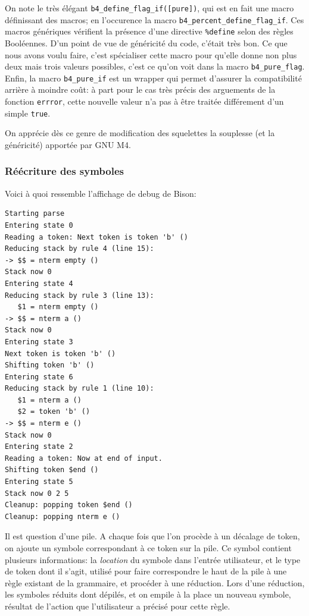 \documentclass[a4paper,11pt,twoside,final]{article}
\begin{document}
  On note le très élégant \texttt{b4\_define\_flag\_if([pure])}, qui est en fait
  une macro définissant des macros; en l'occurence la macro
  \texttt{b4\_percent\_define\_flag\_if}. Ces macros génériques vérifient la
  présence d'une directive \texttt{\%define} selon des règles Booléennes. D'un
  point de vue de généricité du code, c'était très bon. Ce que nous avons voulu
  faire, c'est spécialiser cette macro pour qu'elle donne non plus deux mais
  trois valeurs possibles, c'est ce qu'on voit dans la macro
  \texttt{b4\_pure\_flag}. Enfin, la macro \texttt{b4\_pure\_if} est un wrapper
  qui permet d'assurer la compatibilité arrière à moindre coût: à part pour le
  cas très précis des arguements de la fonction \texttt{errror}, cette nouvelle
  valeur n'a pas à être traitée différement d'un simple \texttt{true}.

  On apprécie dès ce genre de modification des squelettes la souplesse (et la
  généricité) apportée par GNU M4.

  \subsubsection{Réécriture des symboles}

  Voici à quoi ressemble l'affichage de debug de Bison:

  \begin{verbatim}
Starting parse
Entering state 0
Reading a token: Next token is token 'b' ()
Reducing stack by rule 4 (line 15):
-> $$ = nterm empty ()
Stack now 0
Entering state 4
Reducing stack by rule 3 (line 13):
   $1 = nterm empty ()
-> $$ = nterm a ()
Stack now 0
Entering state 3
Next token is token 'b' ()
Shifting token 'b' ()
Entering state 6
Reducing stack by rule 1 (line 10):
   $1 = nterm a ()
   $2 = token 'b' ()
-> $$ = nterm e ()
Stack now 0
Entering state 2
Reading a token: Now at end of input.
Shifting token $end ()
Entering state 5
Stack now 0 2 5
Cleanup: popping token $end ()
Cleanup: popping nterm e ()
  \end{verbatim}

  Il est question d'une pile. A chaque fois que l'on procède à un décalage de
  token, on ajoute un symbole correspondant à ce token sur la pile. Ce symbol
  contient plusieurs informations: la \textit{location} du symbole dans
  l'entrée utilisateur, et le type de token dont il s'agit, utilisé pour
  faire correspondre le haut de la pile à une règle existant de la grammaire,
  et procéder à une réduction. Lors d'une réduction, les symboles réduits dont
  dépilés, et on empile à la place un nouveau symbole, résultat de l'action que
  l'utilisateur a précisé pour cette règle.
\end{document}
